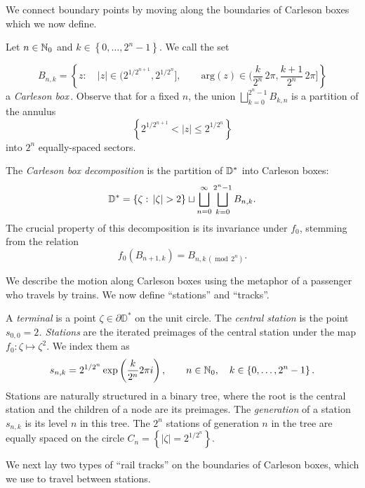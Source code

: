 We connect boundary points by moving along the boundaries of Carleson boxes which we now define.
\begin{definition}
Let $n\in\mathbb{N}_{0}$ and $k\in\left\{ 0,\ldots,2^{n}-1\right\} $. We call the set

\[
B_{n,k}=\left\{ z:\quad\left|z\right|\in\biggl(2^{1/2^{n+1}}, 2^{1/2^{n}} \biggl],\qquad\mathrm{arg}(z)\in\biggl(\frac{k}{2^{n}} \, 2\pi,\frac{k+1}{2^{n}} \, 2\pi\biggl]\right\} 
\]
a \emph{Carleson box}\,.
Observe that for a fixed $n$, the union $\bigsqcup_{k=0}^{2^{n}-1}B_{k,n}$
is a partition of the annulus 
\[
\left\{ 2^{1/2^{n+1}} <\left|z\right|\leq 2^{1/2^{n}} \right\} 
\]
 into $2^{n}$ equally-spaced sectors.
 
The \emph{Carleson box decomposition} is the partition of $\mathbb{D}^{*}$ into Carleson
boxes:
\[
\D^{*}=\left\{ \zeta:\,\left|\zeta\right|>2\right\} \sqcup\bigsqcup_{n=0}^{\infty}\bigsqcup_{k=0}^{2^{n}-1}B_{n,k}.
\]
The crucial property of this decomposition is its invariance under $f_{0}$,
stemming from the relation
\begin{equation*}
f_{0}\left(B_{n+1,k}\right)=B_{n,k \,(\operatorname{mod} \,2^n)}.
\end{equation*}
\end{definition}

We describe the motion along Carleson boxes using the metaphor of a passenger who travels by trains. 
We now define \enquote{stations} and \enquote{tracks}.

\begin{definition}
A \emph{terminal} is a point $\zeta \in \partial \mathbb D^*$ on the unit circle.
The \emph{central station} is the point\emph{ $s_{0,0}=2$. Stations
}are the iterated preimages of the central station under the map $f_{0}:\zeta\mapsto \zeta^{2}$.
We index them as 
\[
s_{n,k}=2^{1/2^{n}} \exp\left(\frac{k}{2^{n}}2\pi i\right),\qquad n\in\mathbb{N}_{0},\quad k\in\left\{ 0,\ldots,2^{n}-1\right\} .
\]
Stations are naturally structured in a binary tree, where the root is the central station and the children of a node are its preimages. The \emph{generation} of a station $s_{n,k}$ is its level $n$ in this tree. The $2^{n}$ stations of generation $n$ in the tree are equally spaced on the circle $C_{n}=\left\{ \left|\zeta\right|=2^{1/2^{n}}\right\} $. 
\end{definition}

We next lay two types of \enquote{rail tracks} on the boundaries of Carleson boxes, which we use to travel between stations.

